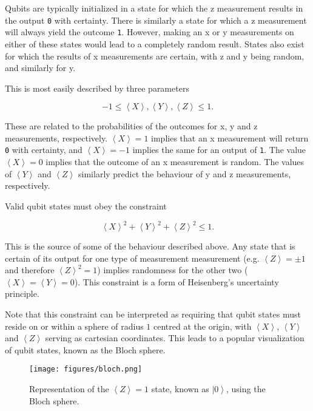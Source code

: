 \documentclass[conference]{IEEEtran}
\begin{document}
Qubits are typically initialized in a state for which the z measurement results in the output \texttt{0} with certainty. There is similarly a state for which a z measurement will always yield the outcome \texttt{1}. However, making an x or y measurements on either of these states would lead to a completely random result. States also exist for which the results of x measurements are certain, with z and y being random, and similarly for y.

This is most easily described by three parameters

$$-1 \leq \left\langle X\right\rangle, \left\langle Y\right\rangle, \left\langle Z\right\rangle \leq 1.$$

These are related to the probabilities of the outcomes for x, y and z measurements, respectively. $\left\langle X\right\rangle=1$ implies that an x measurement will return \texttt{0} with certainty, and $\left\langle X\right\rangle=-1$ implies the same for an output of \texttt{1}. The value $\left\langle X\right\rangle=0$ implies that the outcome of an x measurement is random. The values of  $\left\langle Y\right\rangle$ and  $\left\langle Z\right\rangle $ similarly predict the behaviour of y and z measurements, respectively.

Valid qubit states must obey the constraint

\begin{equation} \label{heisenberg}
\left\langle X\right\rangle^2 + \left\langle Y\right\rangle^2 + \left\langle Z\right\rangle^2 \leq 1.
\end{equation}

This is the source of some of the behaviour described above. Any state that is certain of its output for one type of measurement measurement (e.g. $\left\langle Z\right\rangle = \pm 1$ and therefore $\left\langle Z\right\rangle^2 = 1$) implies randomness for the other two ($\left\langle X\right\rangle = \left\langle Y\right\rangle = 0$). This constraint is a form of Heisenberg's uncertainty principle.

Note that this constraint can be interpreted as requiring that qubit states must reside on or within a sphere of radius $1$ centred at the origin, with $\left\langle X\right\rangle$, $\left\langle Y\right\rangle$ and $\left\langle Z\right\rangle$ serving as cartesian coordinates. This leads to a popular visualization of qubit states, known as the Bloch sphere.

\begin{figure}[htbp]
\begin{center}
\texttt{[image: figures/bloch.png]}
\caption{Representation of the $\left\langle Z\right\rangle = 1$ state, known as $\left| 0 \right\rangle$, using the Bloch sphere. }
\label{bloch}
\end{center}
\end{figure}
\end{document}
